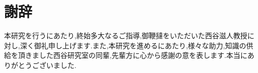 \chapter*{謝辞} 
本研究を行うにあたり,終始多大なるご指導,御鞭撻をいただいた西谷滋人教授に対し,深く御礼申し上げます.また,本研究を進めるにあたり,様々な助力,知識の供給を頂きました西谷研究室の同輩,先輩方に心から感謝の意を表します.本当にありがとうございました.